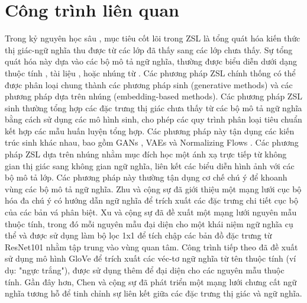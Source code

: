 \section{Công trình liên quan}

Trong kỷ nguyên học sâu \cite{5, 15, 16, 31, 50, 52, 53, 54, 55, 56, 57, 62, 63, 65, 67, 68, 69, 70, 71}, mục tiêu cốt lõi trong ZSL \cite{7, 8, 9, 11, 14, 22, 23, 24, 25, 28, 42, 45, 58, 60} là tổng quát hóa kiến thức thị giác-ngữ nghĩa thu được từ các lớp đã thấy sang các lớp chưa thấy. Sự tổng quát hóa này dựa vào các bộ mô tả ngữ nghĩa, thường được biểu diễn dưới dạng thuộc tính \cite{21}, tài liệu \cite{20}, hoặc nhúng từ \cite{36}. Các phương pháp ZSL chính thống có thể được phân loại chung thành các phương pháp sinh (generative methods) và các phương pháp dựa trên nhúng (embedding-based methods). Các phương pháp ZSL sinh thường tổng hợp các đặc trưng thị giác chưa thấy từ các bộ mô tả ngữ nghĩa bằng cách sử dụng các mô hình sinh, cho phép các quy trình phân loại tiêu chuẩn kết hợp các mẫu huấn luyện tổng hợp. Các phương pháp này tận dụng các kiến trúc sinh khác nhau, bao gồm GANs \cite{45, 60, 73}, VAEs \cite{43, 51} và Normalizing Flows \cite{10, 12, 44}. Các phương pháp ZSL dựa trên nhúng nhằm mục đích học một ánh xạ trực tiếp từ không gian thị giác sang không gian ngữ nghĩa, liên kết các biểu diễn hình ảnh với các bộ mô tả lớp. Các phương pháp này thường tận dụng cơ chế chú ý để khoanh vùng các bộ mô tả ngữ nghĩa. Zhu và cộng sự \cite{74} đã giới thiệu một mạng lưới cục bộ hóa đa chú ý có hướng dẫn ngữ nghĩa để trích xuất các đặc trưng chi tiết cục bộ của các bản vá phân biệt. Xu và cộng sự \cite{61} đã đề xuất một mạng lưới nguyên mẫu thuộc tính, trong đó mỗi nguyên mẫu đại diện cho một khái niệm ngữ nghĩa cụ thể và được sử dụng làm bộ lọc 1x1 để tích chập các bản đồ đặc trưng từ ResNet101 nhằm tập trung vào vùng quan tâm. Công trình tiếp theo \cite{33} đã đề xuất sử dụng mô hình GloVe \cite{39} để trích xuất các véc-tơ ngữ nghĩa từ tên thuộc tính (ví dụ: "ngực trắng"), được sử dụng thêm để đại diện cho các nguyên mẫu thuộc tính. Gần đây hơn, Chen và cộng sự \cite{3} đã phát triển một mạng lưới chưng cất ngữ nghĩa tương hỗ để tinh chỉnh sự liên kết giữa các đặc trưng thị giác và ngữ nghĩa.

